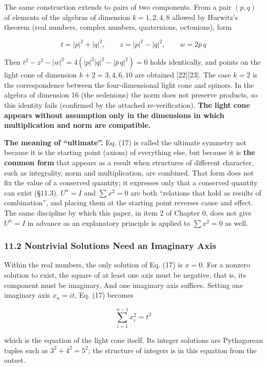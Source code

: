 \documentclass[
  a4paper,
]{article}
\begin{document}
The same construction extends to pairs of two components. From a pair
\((p,q)\) of elements of the algebras of dimension \(k=1,2,4,8\) allowed
by Hurwitz's theorem (real numbers, complex numbers, quaternions,
octonions), form

\[
t=|p|^2+|q|^2,\qquad z=|p|^2-|q|^2,\qquad w=2\bar p\,q
\tag{17c}
\]

Then \(t^2-z^2-|w|^2=4\left(|p|^2|q|^2-|\bar p\,q|^2\right)=0\) holds
identically, and points on the light cone of dimension \(k+2=3,4,6,10\)
are obtained {[}22{]}{[}23{]}. The case \(k=2\) is the correspondence
between the four-dimensional light cone and spinors. In the algebra of
dimension 16 (the sedenions) the norm does not preserve products, so
this identity fails (confirmed by the attached re-verification).
\textbf{The light cone appears without assumption only in the dimensions
in which multiplication and norm are compatible.}

\textbf{The meaning of ``ultimate''.} Eq. (17) is called the ultimate
symmetry not because it is the starting point (axiom) of everything
else, but because it is \textbf{the common form} that appears as a
result when structures of different character, such as integrality, norm
and multiplication, are combined. That form does not fix the value of a
conserved quantity; it expresses only that a conserved quantity can
exist (§11.3). \(U^n=I\) and \(\sum x^2=0\) are both ``relations that
hold as results of combination'', and placing them at the starting point
reverses cause and effect. The same discipline by which this paper, in
item 2 of Chapter 0, does not give \(U^n=I\) in advance as an
explanatory principle is applied to \(\sum x^2=0\) as well.

\subsubsection{11.2 Nontrivial Solutions Need an Imaginary
Axis}\label{nontrivial-solutions-need-an-imaginary-axis}

Within the real numbers, the only solution of Eq. (17) is \(x=0\). For a
nonzero solution to exist, the square of at least one axis must be
negative, that is, its component must be imaginary. And one imaginary
axis suffices. Setting one imaginary axis \(x_n=it\), Eq. (17) becomes

\[
\sum_{i=1}^{n-1}x_i^2=t^2
\tag{18}
\]

which is the equation of the light cone itself. Its integer solutions
are Pythagorean tuples such as \(3^2+4^2=5^2\); the structure of
integers is in this equation from the outset.
\end{document}
